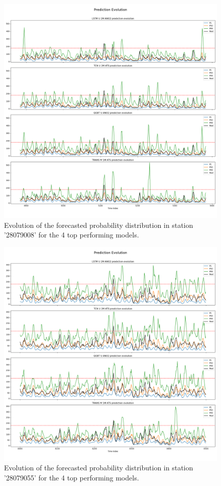 \documentclass[12pt,a4paper]{book}
\begin{document}
\begin{figure}[h]
  \centering  
  \includegraphics[width=\textwidth]{predevo1.png}
  \caption{Evolution of the forecasted probability distribution in station '28079008' for the 4 top performing models.}
  \label{fig:evo_pred1}
\end{figure}

\begin{figure}[h]
  \centering  
  \includegraphics[width=\textwidth]{predevo2.png}
  \caption{Evolution of the forecasted probability distribution in station '28079055' for the 4 top performing models.}
  \label{fig:evo_pred2}
\end{figure}
\end{document}
